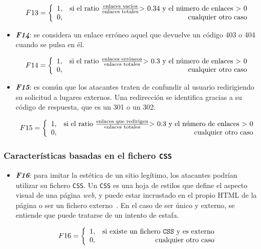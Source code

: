 \begin{itemize}
	\[F13 = \left\{ \begin{array}{lr} 1, & \text{si el ratio } \frac{\text{enlaces vacíos}}{\text{enlaces totales}} \text{> 0.34 y el número de enlaces > 0} \\
	0, & \text{\raggedright cualquier otro caso} \label{eqn:phishing_f13} \end{array}\right.\]

	\item \textit{\textbf{F14}}: se considera un enlace erróneo aquel que devuelve un código 403 o 404 cuando se pulsa en él.

	\[F14 = \left\{ \begin{array}{lr} 1, & \text{si el ratio } \frac{\text{enlaces erróneos}}{\text{enlaces totales}} \text{> 0.3 y el número de enlaces > 0} \\
	0, & \text{\raggedright cualquier otro caso} \label{eqn:phishing_f14} \end{array}\right.\]

	\item \textit{\textbf{F15}}: es común que los atacantes traten de confundir al usuario redirigiendo su solicitud a lugares externos. Una redirección se identifica gracias a su código de respuesta, que es un 301 o un 302.

	\[F15 = \left\{ \begin{array}{lr} 1, & \text{si el ratio } \frac{\text{enlaces que redirigen}}{\text{enlaces totales}} \text{> 0.3 y el número de enlaces > 0} \\
	0, & \text{\raggedright cualquier otro caso} \label{eqn:phishing_f15} \end{array}\right.\]
\end{itemize}


\subsubsection{Características basadas en el fichero \texttt{CSS}}

\begin{itemize}
	\item \textit{\textbf{F16}}: para imitar la estética de un sitio legítimo, los atacantes podrían utilizar su fichero \texttt{CSS}. Un \texttt{CSS} es una hoja de estilos que define el aspecto visual de una página \textit{web}, y puede estar incrustado en el propio HTML de la página o ser un fichero externo~\cite{cssExternos}. En el caso de ser único y externo, se entiende que puede tratarse de un intento de estafa.

	\[F16 = \left\{ \begin{array}{lr} 1, & \text{si existe un fichero \texttt{CSS} y es externo}\\
	0, & \text{\raggedright cualquier otro caso} \label{eqn:phishing_f16} \end{array}\right.\]
\end{itemize}


